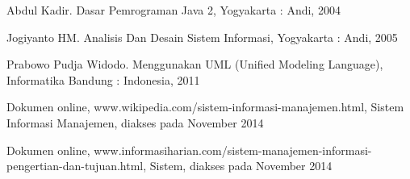 \documentclass{jtetiproposalskripsi}
\begin{document}

\begin{thebibliography}{9}

Abdul Kadir. Dasar Pemrograman Java 2, Yogyakarta : Andi, 2004

Jogiyanto HM. Analisis Dan Desain  Sistem Informasi, Yogyakarta : Andi, 2005

Prabowo Pudja Widodo. Menggunakan UML (Unified Modeling Language), Informatika Bandung : Indonesia, 2011

Dokumen online, www.wikipedia.com/sistem-informasi-manajemen.html, Sistem Informasi Manajemen, diakses pada November 2014

Dokumen online, www.informasiharian.com/sistem-manajemen-informasi-pengertian-dan-tujuan.html, Sistem, diakses pada November 2014

\end{thebibliography}
\end{document}
